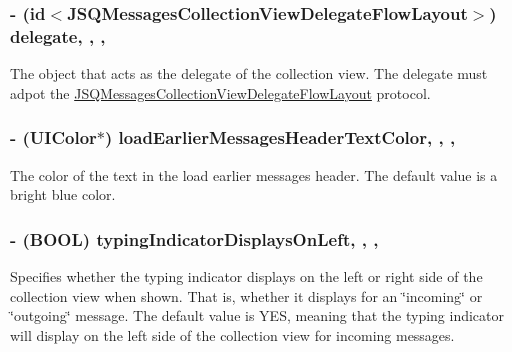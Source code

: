 \subsubsection[{delegate}]{\setlength{\rightskip}{0pt plus 5cm}-\/ (id$<${\bf J\+S\+Q\+Messages\+Collection\+View\+Delegate\+Flow\+Layout}$>$) delegate\hspace{0.3cm}{\ttfamily [read]}, {\ttfamily [write]}, {\ttfamily [nonatomic]}, {\ttfamily [weak]}}\label{interface_j_s_q_messages_collection_view_ac00c8069a3335df10da0bf609b27ef74}
The object that acts as the delegate of the collection view. The delegate must adpot the {\ttfamily \hyperlink{protocol_j_s_q_messages_collection_view_delegate_flow_layout-p}{J\+S\+Q\+Messages\+Collection\+View\+Delegate\+Flow\+Layout}} protocol. \hypertarget{interface_j_s_q_messages_collection_view_ad49ab227a62c4a2a90a24400123d8f43}{}
\subsubsection[{load\+Earlier\+Messages\+Header\+Text\+Color}]{\setlength{\rightskip}{0pt plus 5cm}-\/ (U\+I\+Color$\ast$) load\+Earlier\+Messages\+Header\+Text\+Color\hspace{0.3cm}{\ttfamily [read]}, {\ttfamily [write]}, {\ttfamily [nonatomic]}, {\ttfamily [strong]}}\label{interface_j_s_q_messages_collection_view_ad49ab227a62c4a2a90a24400123d8f43}
The color of the text in the load earlier messages header. The default value is a bright blue color. \hypertarget{interface_j_s_q_messages_collection_view_a00d402fe933028dbf2c112c1637660dc}{}
\subsubsection[{typing\+Indicator\+Displays\+On\+Left}]{\setlength{\rightskip}{0pt plus 5cm}-\/ (B\+O\+O\+L) typing\+Indicator\+Displays\+On\+Left\hspace{0.3cm}{\ttfamily [read]}, {\ttfamily [write]}, {\ttfamily [nonatomic]}, {\ttfamily [assign]}}\label{interface_j_s_q_messages_collection_view_a00d402fe933028dbf2c112c1637660dc}
Specifies whether the typing indicator displays on the left or right side of the collection view when shown. That is, whether it displays for an \char`\"{}incoming\char`\"{} or \char`\"{}outgoing\char`\"{} message. The default value is {\ttfamily Y\+E\+S}, meaning that the typing indicator will display on the left side of the collection view for incoming messages.

